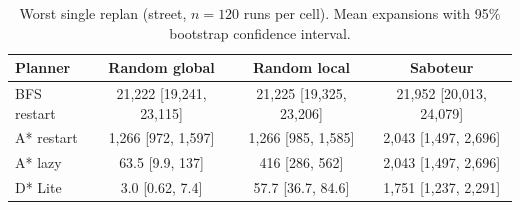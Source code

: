 \begin{table}[!t]
\centering
\footnotesize
\caption{Worst single replan (street, $n=120$ runs per cell). Mean expansions with 95\% bootstrap confidence interval.}
\label{tab:hitch-street}
\begin{tabular}{lccc}
\toprule
Planner & Random global & Random local & Saboteur \\
\midrule
BFS restart & 21,222 [19,241, 23,115] & 21,225 [19,325, 23,206] & 21,952 [20,013, 24,079] \\
A* restart & 1,266 [972, 1,597] & 1,266 [985, 1,585] & 2,043 [1,497, 2,696] \\
A* lazy & 63.5 [9.9, 137] & 416 [286, 562] & 2,043 [1,497, 2,696] \\
D* Lite & 3.0 [0.62, 7.4] & 57.7 [36.7, 84.6] & 1,751 [1,237, 2,291] \\
\bottomrule
\end{tabular}
\end{table}
